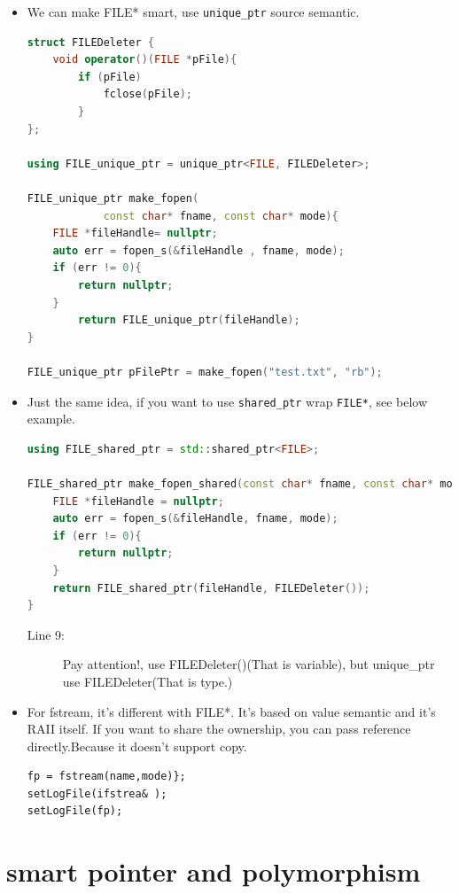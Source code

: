 \documentclass[a4paper,11pt,twoside]{book}
\begin{document}
\begin{itemize}
	\item We can make FILE* smart, use \texttt{unique\_ptr} source semantic.
\begin{lstlisting}[frame=single, language=c++]
struct FILEDeleter {
	void operator()(FILE *pFile){
		if (pFile)
			fclose(pFile);
		}
};
	
using FILE_unique_ptr = unique_ptr<FILE, FILEDeleter>;
	
FILE_unique_ptr make_fopen(
			const char* fname, const char* mode){
	FILE *fileHandle= nullptr;
	auto err = fopen_s(&fileHandle , fname, mode); 
	if (err != 0){
		return nullptr;
	} 
		return FILE_unique_ptr(fileHandle);
}
	
FILE_unique_ptr pFilePtr = make_fopen("test.txt", "rb");
\end{lstlisting}
	
\item Just the same idea, if you want to use \texttt{shared\_ptr} wrap \texttt{FILE*}, see below example.
\begin{lstlisting}[frame=single, language=c++]
using FILE_shared_ptr = std::shared_ptr<FILE>;
	
FILE_shared_ptr make_fopen_shared(const char* fname, const char* mode){
	FILE *fileHandle = nullptr;
	auto err = fopen_s(&fileHandle, fname, mode);
	if (err != 0){
		return nullptr;
	}
	return FILE_shared_ptr(fileHandle, FILEDeleter());
}
\end{lstlisting}
\begin{description}
	\item[Line 9:] Pay attention!, use FILEDeleter()(That is variable), but unique\_ptr use FILEDeleter(That is type.)
\end{description}

	\item For fstream, it's different with FILE*. It's based on value semantic and it's RAII itself. If you want to share the ownership, you can pass reference directly.Because it doesn't support copy.

\begin{lstlisting}[numbers=none]
fp = fstream(name,mode)};
setLogFile(ifstrea& );
setLogFile(fp);
\end{lstlisting}

\end{itemize}


\section{smart pointer and polymorphism}
\end{document}
